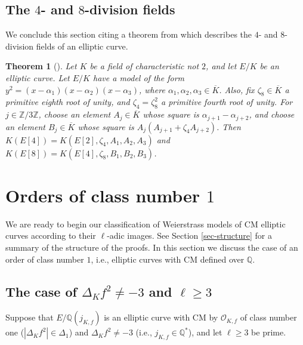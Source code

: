 \documentclass[11pt]{amsart}
\newtheorem{theorem}[defn]{Theorem}
\theoremstyle{definition}
\newcommand{\Q}{\mathbb Q}
\newcommand{\Z}{\mathbb Z}
\newcommand{\Of}{\mathcal{O}_{K,f}}
\begin{document}

\subsection{The $4$- and $8$-division fields}

We conclude this section citing a theorem from \cite{yelton} which describes the $4$- and $8$-division fields of an elliptic curve.

\begin{theorem}[\cite{yelton}]\label{thm-8divisionfield}
\label{8-division-thm} Let $K$ be a field of characteristic not $2$, and let $E/K$ be an elliptic curve. Let $E/K$ have a model of the form $y^2 = (x - \alpha_1)(x - \alpha_2)(x - \alpha_3)$,
where $\alpha_1,\alpha_2,\alpha_3 \in \overline{K}$. Also, fix $\zeta_8 \in \overline{K}$ a primitive eighth root of unity, and $\zeta_4 = \zeta_8^2$ a primitive fourth root of unity. For $j \in \Z/3\Z$, choose an element $A_j \in \overline{K}$ whose square is $\alpha_{j + 1} - \alpha_{j + 2}$, and choose an element $B_j \in \overline{K}$ whose square is $A_j(A_{j + 1} + \zeta_4 A_{j + 2})$. Then $K(E[4]) = K(E[2], \zeta_4, A_1, A_2, A_3)$ and $K(E[8]) = K(E[4], \zeta_8, B_1, B_2, B_3)$.
\end{theorem}



\section{Orders of class number $1$}\label{sec-classnumber1}

We are ready to begin our classification of Weierstrass models of CM elliptic curves according to their $\ell$-adic images. See Section \ref{sec-structure} for a summary of the structure of the proofs. In this section we discuss the case of an order of class number $1$, i.e., elliptic curves with CM defined over $\Q$.

\subsection{The case of $\Delta_K f^2\neq -3$ and $\ell\geq 3$}\label{sec-notminus3ellmorethan2}

 Suppose that $E/\Q(j_{K,f})$ is an elliptic curve with CM by $\Of$ of class number one ($|\Delta_K f^2|\in \Delta_1$) and $\Delta_K f^2\neq -3$ (i.e., $j_{K,f}\in \Q^\ast$), and let $\ell\geq 3$ be prime. 
 
\end{document}
